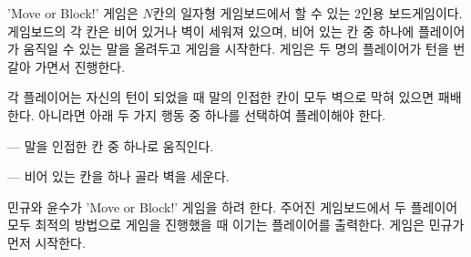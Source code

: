 'Move or Block!' 게임은  $N$칸의 일자형 게임보드에서 할 수 있는 $2$인용 보드게임이다. 게임보드의 각 칸은 비어 있거나 벽이 세워져 있으며, 비어 있는 칸 중 하나에 플레이어가 움직일 수 있는 말을 올려두고 게임을 시작한다. 게임은 두 명의 플레이어가 턴을 번갈아 가면서 진행한다.

각 플레이어는 자신의 턴이 되었을 때 말의 인접한 칸이 모두 벽으로 막혀 있으면 패배한다. 아니라면 아래 두 가지 행동 중 하나를 선택하여 플레이해야 한다.

 --- 말을 인접한 칸 중 하나로 움직인다.

 --- 비어 있는 칸을 하나 골라 벽을 세운다.

민규와 윤수가 'Move or Block!' 게임을 하려 한다. 주어진 게임보드에서 두 플레이어 모두 최적의 방법으로 게임을 진행했을 때 이기는 플레이어를 출력한다. 게임은 민규가 먼저 시작한다.
